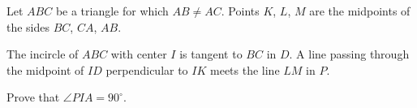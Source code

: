 Let $ABC$ be a triangle for which $AB \neq AC$. Points $K$,  $L$,  $M$ are the midpoints of the sides $BC$,  $CA$,  $AB$.

The incircle of $ABC$ with center $I$ is tangent to $BC$ in $D$. A line passing through the midpoint of $ID$ perpendicular to $IK$ meets the line $LM$ in $P$.

Prove that $\angle PIA = 90 ^{\circ}$.